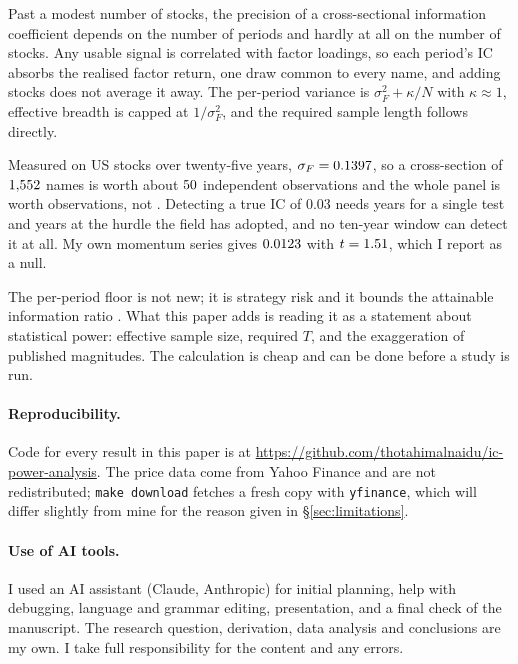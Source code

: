 \documentclass[11pt,a4paper]{article}
\newcommand{\sF}{\sigma_F}
\begin{document}
Past a modest number of stocks, the precision of a cross-sectional information
coefficient depends on the number of periods and hardly at all on the number of stocks.
Any usable signal is correlated with factor loadings, so each period's IC absorbs the
realised factor return, one draw common to every name, and adding stocks does not
average it away. The per-period variance is $\sF^2 + \kappa/N$ with $\kappa \approx 1$,
effective breadth is capped at $1/\sF^2$, and the required sample length follows
directly.

Measured on \nTickers{} US stocks over twenty-five years, $\sF = \momFloor$, so a
cross-section of $1{,}552$ names is worth about $50$ independent observations and
the whole panel is worth \effObs{} observations, not \panelObs{}. Detecting a true IC of
$0.03$ needs \reqYsingle{} years for a single test and \reqYhlz{} years at the hurdle the
field has adopted, and no ten-year window can detect it at all. My own momentum series
gives $0.0123$ with $t = 1.51$, which I report as a null.

The per-period floor is not new; it is strategy risk \citep{qian2004active} and it bounds
the attainable information ratio \citep{ding2017redux}. What this paper adds is reading
it as a statement about statistical power: effective sample size, required $T$, and the
exaggeration of published magnitudes. The calculation is cheap and can be done before a
study is run.

\paragraph{Reproducibility.}
Code for every result in this paper is at
\url{https://github.com/thotahimalnaidu/ic-power-analysis}. The price data come from Yahoo
Finance and are not redistributed; \texttt{make download} fetches a fresh copy with
\texttt{yfinance}, which will differ slightly from mine for the reason given in
\S\ref{sec:limitations}.

\paragraph{Use of AI tools.}
I used an AI assistant (Claude, Anthropic) for initial planning, help with debugging,
language and grammar editing, presentation, and a final check of the manuscript. The
research question, derivation, data analysis and conclusions are my own. I take full responsibility for the content and any errors.



\end{document}
